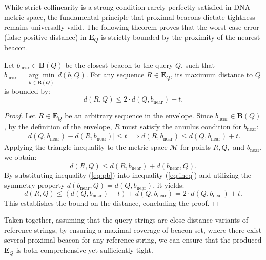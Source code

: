\documentclass[10pt,runningheads]{llncs}
\begin{document}
While strict collinearity is a strong condition rarely perfectly satisfied in DNA metric space, the fundamental principle that proximal beacons dictate tightness remains universally valid. The following theorem proves that the worst-case error (false positive distance) in $\textbf{E}_Q$ is strictly bounded by the proximity of the nearest beacon.

\begin{theorem}
    Let $b_{\mathrm{near}} \in \textbf{B}(Q)$ be the closest beacon to the query $Q$, such that $b_{\mathrm{near}} = \underset{b \in \textbf{B}(Q)}{\arg\min} \, d(b, Q)$. For any sequence $R \in \textbf{E}_Q$, its maximum distance to $Q$ is bounded by:
    \begin{equation}
        d(R, Q) \leq 2 \cdot d(Q, b_{\mathrm{near}}) + t.
    \end{equation}
    \label{thm:nearbound}
\end{theorem}

\begin{proof}
    Let $R \in \textbf{E}_Q$ be an arbitrary sequence in the envelope. Since $b_{\mathrm{near}} \in \textbf{B}(Q)$, by the definition of the envelope, $R$ must satisfy the annulus condition for $b_{\mathrm{near}}$:
    \begin{align}
        |d(Q, b_{\mathrm{near}}) - d(R, b_{\mathrm{near}})| \leq t \implies d(R, b_{\mathrm{near}}) \leq d(Q, b_{\mathrm{near}}) + t. \label{eq:pb} 
    \end{align}
    Applying the triangle inequality to the metric space $\mathcal{M}$ for points $R, Q,$ and $b_{\mathrm{near}}$, we obtain:
    \begin{equation}
        d(R, Q) \leq d(R, b_{\mathrm{near}}) + d(b_{\mathrm{near}}, Q) \label{eq:ineq}.
    \end{equation}
    By substituting inequality (\ref{eq:pb}) into inequality (\ref{eq:ineq}) and utilizing the symmetry property $d(b_{\mathrm{near}}, Q) = d(Q, b_{\mathrm{near}})$, it yields:
    \begin{equation*}
        d(R, Q) \leq (d(Q, b_{\mathrm{near}}) + t) + d(Q, b_{\mathrm{near}}) = 2 \cdot d(Q, b_{\mathrm{near}}) + t.
    \end{equation*}
    This establishes the bound on the distance, concluding the proof.
\end{proof}

Taken together,  assuming that the query strings are close-distance variants of reference strings,
by ensuring a maximal coverage of beacon set,
where there exist several proximal beacon for any reference string,
we can ensure that the produced $\textbf{E}_Q$ is both comprehensive yet sufficiently tight.
\end{document}
